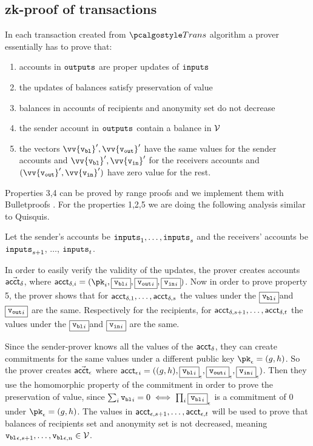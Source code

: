 \subsection{zk-proof of transactions}
In each transaction created from $\trans$ algorithm a prover essentially has to prove that:
\begin{enumerate}
    \item accounts in ${\textup{\texttt{outputs}}}$ are proper updates of ${\textup{\texttt{inputs}}}$
    \item the updates of balances satisfy preservation of value
    \item balances in accounts of recipients and anonymity set do not decrease
    \item the sender account in ${\textup{\texttt{outputs}}}$ contain a balance in $\mathcal{V}$
    \item the vectors $\vv{\vbl}^\prime, \vv{\vout}^\prime$ have the same values for the sender accounts and $\vv{\vbl}^\prime, \vv{\vin}^\prime$ for the receivers accounts and $(\vv{\vout}^\prime, \vv{\vin}^\prime)$ have zero value for the rest.
\end{enumerate}

Properties 3,4 can be proved by range proofs and we implement them with Bulletproofs \cite{Bulletproofs}. 
For the properties 1,2,5 we are doing the following analysis similar to Quisquis\cite{fauzi2019quisquis}.

Let the sender's accounts be ${\textup{\texttt{inputs}}}_1, \dots, {\textup{\texttt{inputs}}}_s$ and the receivers' accounts be ${\textup{\texttt{inputs}}}_{s+1}$, $\dots$, ${\textup{\texttt{inputs}}}_{t}$.

In order to easily verify the validity of the updates, the prover creates accounts $\vec{\textup{\textsf{acct}}_{\delta}}$, where ${\acct_{\delta,i}} = (\pk_i, \comm{{\vbl}_i}, \comm{{\vout}_i}, \comm{{\vin}_i})$. Now in order to prove property 5, the prover shows that for $\textup{\textsf{acct}}_{\delta, 1}, \dots, \textup{\textsf{acct}}_{\delta, s}$ the values under the $\fbox{${\textup{\texttt{{v}}}_{\textup{\texttt{{bl}}}}}_i$}$and $\fbox{${\textup{\texttt{{v}}}_{\textup{\texttt{{out}}}}}_i$}$ are the same. Respectively for the recipients, for $\textup{\textsf{acct}}_{\delta, s+1}, \dots, \textup{\textsf{acct}}_{\delta, t}$ the values under the $\fbox{${\textup{\texttt{{v}}}_{\textup{\texttt{{bl}}}}}_i$}$and $\fbox{${\textup{\texttt{{v}}}_{\textup{\texttt{{in}}}}}_i$}$ are the same.

Since the sender-prover knows all the values of the $\textup{\textsf{acct}}_{\delta}$, they can create commitments for the same values under a different public key $\pk_{\epsilon} = (g,h)$. So the prover creates $\vec{\textup{\textsf{acct}}_{\epsilon}}$ where ${\textup{\textsf{acct}}_{\epsilon}}_i = ((g,h), \fbox{${\textup{\texttt{{v}}}_{\textup{\texttt{{bl}}}}}_i$}_{\epsilon}, \fbox{${\textup{\texttt{{v}}}_{\textup{\texttt{{out}}}}}_i$}_{\epsilon}, \fbox{${\textup{\texttt{{v}}}_{\textup{\texttt{{in}}}}}_i$}_{\epsilon})$. Then they use the homomorphic property of the commitment in order to prove the preservation of value, since $\sum_i{{\textup{\texttt{{v}}}_{\textup{\texttt{{bl}}}}}_i} = 0 \iff \prod_i{\fbox{${\textup{\texttt{{v}}}_{\textup{\texttt{{bl}}}}}_i$}}_{\epsilon}$ is a commitment of 0 under $\pk_{\epsilon} = (g,h)$. The values in $\textup{\textsf{acct}}_{\epsilon,s+1}, \dots, \textup{\textsf{acct}}_{\epsilon,t}$ will be used to prove that balances of recipients set and anonymity set is not decreased, meaning ${\textup{\texttt{{v}}}_{\textup{\texttt{{bl}}}}}_{\epsilon, s+1}, \dots, {\textup{\texttt{{v}}}_{\textup{\texttt{{bl}}}}}_{\epsilon, n}  \in \mathcal{V}$.

